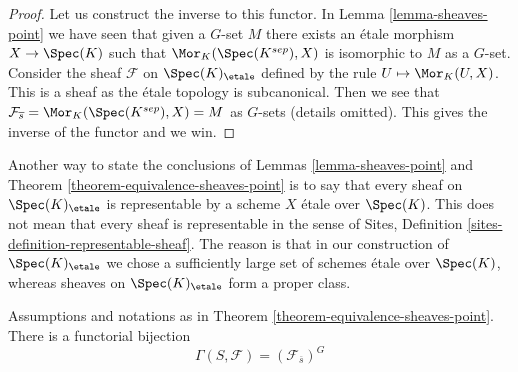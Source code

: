 \begin{proof}
Let us construct the inverse to this functor. In
Lemma \ref{lemma-sheaves-point}
we have seen that given a $G$-set $M$ there exists an \'etale morphism
$X \to \Spec(K)$
such that $\Mor_K(\Spec(K^{sep}), X)$ is
isomorphic to $M$ as a $G$-set. Consider the sheaf
$\mathcal{F}$ on $\Spec(K)_\etale$ defined by
the rule $U \mapsto \Mor_K(U, X)$. This is a sheaf as the \'etale
topology is subcanonical. Then we see that
$\mathcal{F}_{\overline{s}} = \Mor_K(\Spec(K^{sep}), X) = M$
as $G$-sets (details omitted). This gives the inverse of the functor and
we win.
\end{proof}

\begin{remark}
\label{remark-every-sheaf-representable}
Another way to state the conclusions of
Lemmas \ref{lemma-sheaves-point} and
Theorem \ref{theorem-equivalence-sheaves-point}
is to say that every sheaf on $\Spec(K)_\etale$ is representable
by a scheme $X$ \'etale over $\Spec(K)$.
This does not mean that every sheaf is representable in the sense of
Sites, Definition \ref{sites-definition-representable-sheaf}.
The reason is that in our construction of $\Spec(K)_\etale$
we chose a sufficiently large set of schemes \'etale over $\Spec(K)$,
whereas sheaves on $\Spec(K)_\etale$ form a proper class.
\end{remark}

\begin{lemma}
\label{lemma-global-sections-point}
Assumptions and notations as in
Theorem \ref{theorem-equivalence-sheaves-point}.
There is a functorial bijection
$$
\Gamma(S, \mathcal{F}) = (\mathcal{F}_{\overline{s}})^G
$$
\end{lemma}

